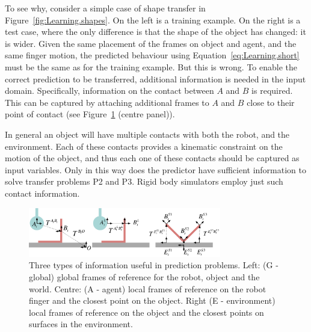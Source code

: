 To see why, consider a simple case of shape transfer in Figure~\ref{fig:Learning.shapes}. On the left is a training example. On the right is a test case, where the only difference is that the shape of the object has changed: it is wider. Given the same placement of the frames on object and agent, and the same finger motion, the predicted behaviour using Equation~\eqref{eq:Learning.short} must be the same as for the training example. But this is wrong. To enable the correct prediction to be transferred, additional information is needed in the input domain. Specifically, information on the contact between $A$ and $B$ is required. This can be captured by attaching additional frames to $A$ and $B$ close to their point of contact (see Figure~\ref{fig:Learning.setup2} (centre panel)).

In general an object will have multiple contacts with both the robot, and the environment. Each of these contacts provides a kinematic constraint on the motion of the object, and thus each one of these contacts should be captured as input variables. Only in this way does the predictor have sufficient information to solve transfer problems P2 and P3. Rigid body simulators employ just such contact information. 


\begin{figure}[t]
\centerline{\includegraphics[width=0.75\textwidth]{information}}
\caption{Three types of information useful in prediction problems. Left: (G - global) global frames of reference for the robot, object and the world. Centre: (A - agent) local frames of reference on the robot finger and the closest point on the object. Right (E - environment) local frames of reference on the object and the closest points on surfaces in the environment.}
\label{fig:Learning.setup2}
\end{figure}

